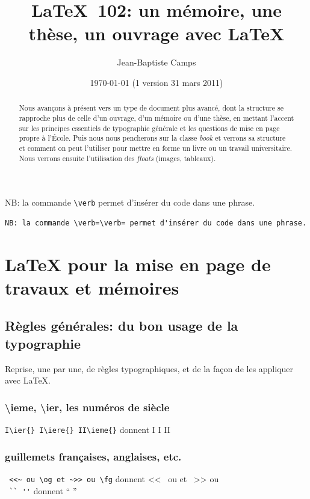 \documentclass[a4paper,twoside,french,12pt]{article}
\title{\LaTeX\ 102: un mémoire, une thèse, un ouvrage avec \LaTeX}
\date{\today{} (1\iere{} version 31 mars 2011)}
\author{Jean-Baptiste Camps}
\begin{document}
\maketitle





\begin{abstract}
Nous avançons à présent vers un type de document plus avancé, dont la structure se rapproche plus de celle d'un ouvrage, d'un mémoire ou d'une thèse, en mettant l'accent sur les principes essentiels de typographie générale et les questions de mise en page propre à l'École. Puis nous nous pencherons sur la classe \textit{book} et verrons sa structure et comment on peut l'utiliser pour mettre en forme un livre ou un travail universitaire. Nous verrons ensuite l'utilisation des \textit{floats} (images, tableaux).
\end{abstract}


NB: la commande \verb=\verb= permet d'insérer du code dans une phrase.
\begin{verbatim}
NB: la commande \verb=\verb= permet d'insérer du code dans une phrase.
\end{verbatim}


\section{\LaTeX{} pour la mise en page de travaux et mémoires}

\subsection{Règles générales: du bon usage de la typographie}
Reprise, une par une, de règles typographiques, et de la façon de les appliquer avec \LaTeX{}.


\subsubsection{\textbackslash{}ieme, \textbackslash{}ier, les numéros de siècle}

\verb=I\ier{} I\iere{} II\ieme{}= donnent I\ier{} I\iere{} II\ieme

\subsubsection{guillemets françaises, anglaises, etc.}
\verb= <<~ ou \og et ~>> ou \fg=  donnent <<~ ou \og et ~>> ou \fg\\
\verb= `` ''= donnent `` ''
\end{document}
